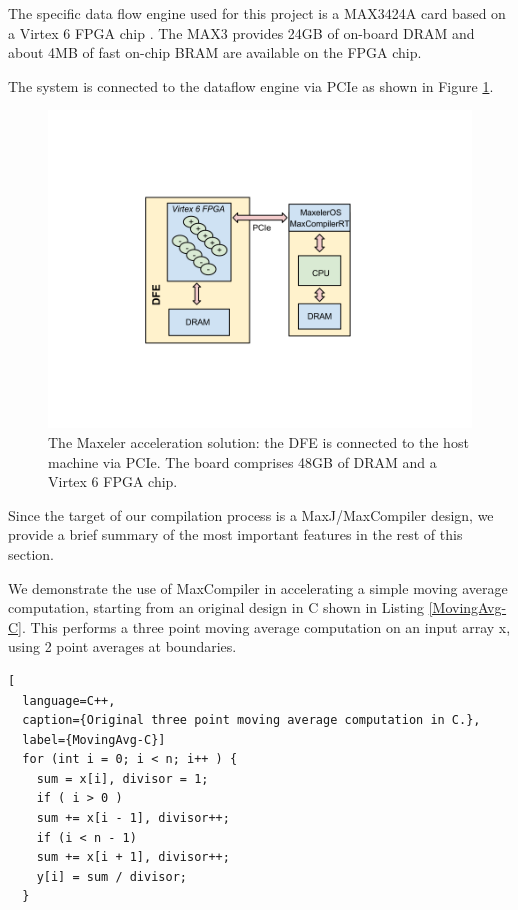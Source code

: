 The specific data flow engine used for this project is a MAX3424A card
based on a Virtex 6 FPGA chip \cite{Virtex6}. The MAX3 provides 24GB of
on-board DRAM and about 4MB of fast on-chip BRAM are available on the
FPGA chip.

The system is connected to the dataflow engine via PCIe as shown in
Figure \ref{fig:max3}.

\begin{figure}[h]
  \centering
  \includegraphics[scale=0.4, trim=0 200 0 200]{figs/max3.png} \caption{
    The Maxeler acceleration solution: the DFE is connected to
    the host machine via PCIe. The board comprises 48GB of DRAM and a
    Virtex 6 FPGA chip. }
  \label{fig:max3}
\end{figure}


Since the target of our compilation process is a MaxJ/MaxCompiler
design, we provide a brief summary of the most important features in
the rest of this section.

We demonstrate the use of MaxCompiler in accelerating a simple moving
average computation, starting from an original design in C shown in
Listing \ref{MovingAvg-C}. This performs a three point moving average
computation on an input array x, using 2 point averages at boundaries.

\begin{lstlisting}[
  language=C++,
  caption={Original three point moving average computation in C.},
  label={MovingAvg-C}]
  for (int i = 0; i < n; i++ ) {
    sum = x[i], divisor = 1;
    if ( i > 0 )
    sum += x[i - 1], divisor++;
    if (i < n - 1)
    sum += x[i + 1], divisor++;
    y[i] = sum / divisor;
  }
\end{lstlisting}

